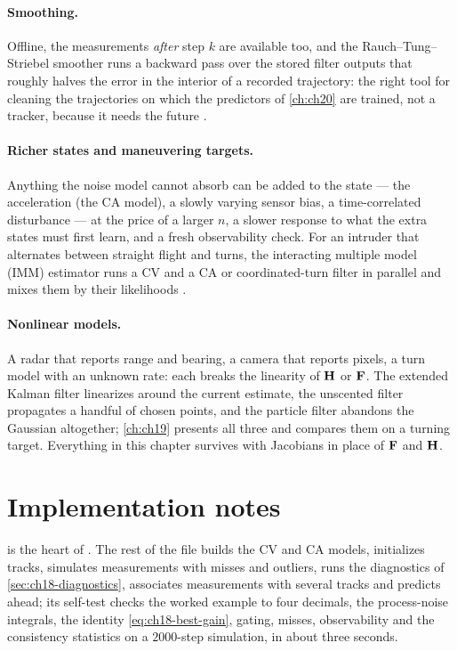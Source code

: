 \paragraph{Smoothing.}
Offline, the measurements \emph{after} step $k$ are available too, and the
Rauch--Tung--Striebel smoother
\cite{rauch1965maximum} runs a backward pass over the stored filter outputs
that roughly halves the error in the interior of a recorded trajectory: the
right tool for cleaning the trajectories on which the predictors of
\cref{ch:ch20} are trained, not a tracker, because it needs the future
\cite{sarkka2013bayesian}.

\paragraph{Richer states and maneuvering targets.}
Anything the noise model cannot absorb can be added to the state --- the
acceleration (the CA model), a slowly varying sensor bias, a time-correlated
disturbance --- at the price of a larger $n$, a slower response to what the
extra states must first learn, and a fresh observability check. For an
intruder that alternates between straight flight and turns, the interacting
multiple model (IMM) estimator runs a CV and a CA or coordinated-turn filter
in parallel and mixes them by their likelihoods \cite{barshalom2001estimation}.

\paragraph{Nonlinear models.}
A radar that reports range and bearing, a camera that reports pixels, a turn
model with an unknown rate: each breaks the linearity of $\mathbf{H}$ or
$\mathbf{F}$. The extended Kalman filter linearizes around the current estimate,
the unscented filter propagates a handful of chosen points, and the particle
filter abandons the Gaussian altogether; \cref{ch:ch19} presents all three and
compares them on a turning target. Everything in this chapter survives with
Jacobians in place of $\mathbf{F}$ and $\mathbf{H}$.

\section{Implementation notes}
\label{sec:ch18-implementation}

 is the heart of . The rest of the
file builds the CV and CA models, initializes tracks, simulates measurements with misses and outliers, runs the diagnostics
of \cref{sec:ch18-diagnostics}, associates measurements with several tracks
and predicts ahead; its self-test checks the worked example to four
decimals, the process-noise integrals, the identity
\cref{eq:ch18-best-gain}, gating, misses, observability and the consistency
statistics on a $2000$-step simulation, in about three seconds.

